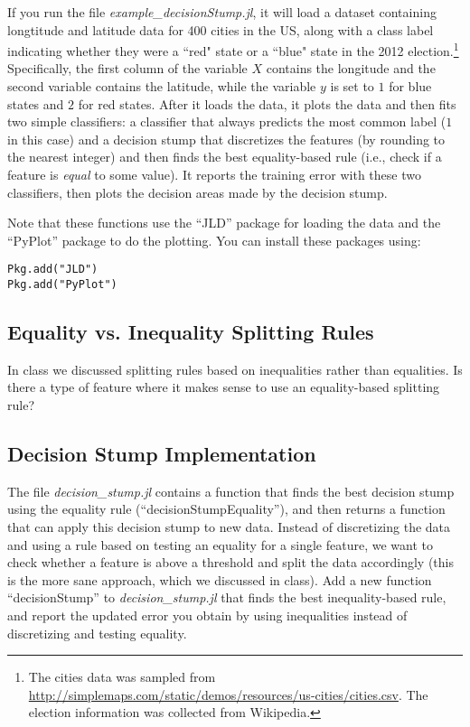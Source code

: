 \documentclass{article}
\def\blu#1{{\color{blu}#1}}
\begin{document}
If you run the file \emph{example\_decisionStump.jl}, it will load a dataset containing longtitude and latitude data for 400 cities in the US, along with a class label indicating whether they were a ``red" state or a ``blue" state in the 2012 election.\footnote{The cities data was sampled from \url{http://simplemaps.com/static/demos/resources/us-cities/cities.csv}. The election information was collected from Wikipedia.} Specifically, the first column of the variable $X$ contains the longitude and the second variable contains the latitude, while the variable $y$ is set to $1$ for blue states and $2$ for red states. After it loads the data, it plots the data and then fits two simple classifiers: a classifier that always predicts the most common label ($1$ in this case) and a decision stump that discretizes the features (by rounding to the nearest integer) and then finds the best equality-based rule (i.e., check if a feature is \emph{equal} to some value). It reports the training error with these two classifiers, then plots the decision areas made by the decision stump.

Note that these functions use the ``JLD'' package for loading the data and the ``PyPlot'' package to do the plotting. You can install these packages using:
\begin{verbatim}
Pkg.add("JLD")
Pkg.add("PyPlot")
\end{verbatim}

\subsection{Equality vs. Inequality Splitting Rules}

In class we discussed splitting rules based on inequalities rather than equalities. \blu{Is there a type of feature where it makes sense to use 
an equality-based splitting rule?}

\subsection{Decision Stump Implementation}

The file \emph{decision\_stump.jl} contains a function  that finds the best decision stump using the equality rule (``decisionStumpEquality''), and then returns a function that can apply this decision stump to new data. Instead of discretizing the data and using a rule based on testing an equality for a single feature, we want to check whether a feature is above a threshold and split the data accordingly (this is the more sane approach, which we discussed in class). \blu{Add a new function ``decisionStump'' to \emph{decision\_stump.jl} that finds the best inequality-based rule, and report the updated error you obtain by using inequalities instead of discretizing and testing equality.}
\end{document}
